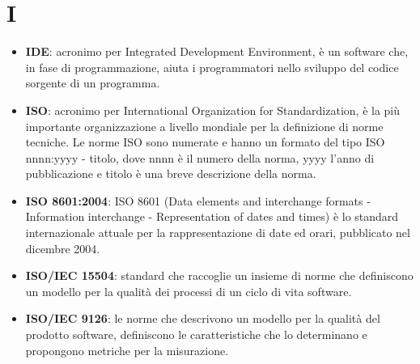 \newpage
\section{I}

\begin{itemize}
	\item \textbf{IDE}: acronimo per Integrated Development Environment, è un software che, in fase di programmazione, aiuta i programmatori nello sviluppo del codice sorgente di un programma.
	\item \textbf{ISO}: acronimo per International Organization for Standardization, è la più importante organizzazione a livello mondiale per la definizione di norme tecniche. Le norme ISO sono numerate e hanno un formato del tipo ISO nnnn:yyyy - titolo, dove nnnn è il numero della norma, yyyy l'anno di pubblicazione e titolo è una breve descrizione della norma.
	\item \textbf{ISO 8601:2004}: ISO 8601 (Data elements and interchange formats - Information interchange - Representation of dates and times) è lo standard internazionale attuale per la rappresentazione di date ed orari, pubblicato nel dicembre 2004.
	\item \textbf{ISO/IEC 15504}: standard che raccoglie un insieme di norme che definiscono un modello per la qualità dei processi di un ciclo di vita software.
	\item \textbf{ISO/IEC 9126}: le norme che descrivono un modello per la qualità del prodotto software, definiscono le caratteristiche che lo determinano e propongono metriche per la misurazione.
\end{itemize}

